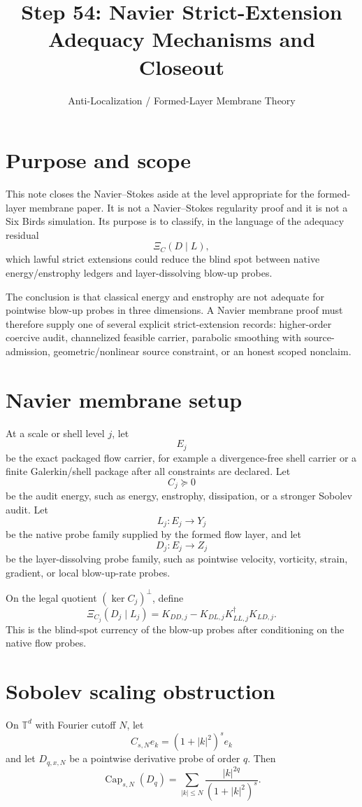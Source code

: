 \documentclass[11pt]{article}
\title{Step 54: Navier Strict-Extension Adequacy Mechanisms and Closeout}
\author{Anti-Localization / Formed-Layer Membrane Theory}
\date{}
\begin{document}
\maketitle

\section{Purpose and scope}
This note closes the Navier--Stokes aside at the level appropriate for the formed-layer membrane paper. It is not a Navier--Stokes regularity proof and it is not a Six Birds simulation. Its purpose is to classify, in the language of the adequacy residual
\[
\Xi_C(D\mid L),
\]
which lawful strict extensions could reduce the blind spot between native energy/enstrophy ledgers and layer-dissolving blow-up probes.

The conclusion is that classical energy and enstrophy are not adequate for pointwise blow-up probes in three dimensions. A Navier membrane proof must therefore supply one of several explicit strict-extension records: higher-order coercive audit, channelized feasible carrier, parabolic smoothing with source-admission, geometric/nonlinear source constraint, or an honest scoped nonclaim.

\section{Navier membrane setup}
At a scale or shell level $j$, let
\[
E_j
\]
be the exact packaged flow carrier, for example a divergence-free shell carrier or a finite Galerkin/shell package after all constraints are declared. Let
\[
C_j\succeq0
\]
be the audit energy, such as energy, enstrophy, dissipation, or a stronger Sobolev audit. Let
\[
L_j:E_j\to Y_j
\]
be the native probe family supplied by the formed flow layer, and let
\[
D_j:E_j\to Z_j
\]
be the layer-dissolving probe family, such as pointwise velocity, vorticity, strain, gradient, or local blow-up-rate probes.

On the legal quotient $(\ker C_j)^\perp$, define
\[
\Xi_{C_j}(D_j\mid L_j)
=
K_{DD,j}-K_{DL,j}K_{LL,j}^{\dagger}K_{LD,j}.
\]
This is the blind-spot currency of the blow-up probes after conditioning on the native flow probes.

\section{Sobolev scaling obstruction}
On $\mathbb T^d$ with Fourier cutoff $N$, let
\[
C_{s,N}e_k=(1+|k|^2)^s e_k
\]
and let $D_{q,x,N}$ be a pointwise derivative probe of order $q$. Then
\[
\operatorname{Cap}_{s,N}(D_q)
=\sum_{|k|\le N}\frac{|k|^{2q}}{(1+|k|^2)^s}.
\]
\end{document}
